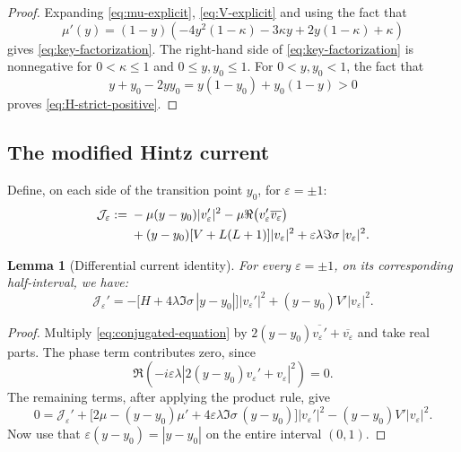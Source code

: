 \documentclass[11pt]{article}
\numberwithin{equation}{section}
\newtheorem{lemma}[theorem]{Lemma}
\newcommand{\br}[1]{\left( #1 \right)}
\begin{document}
	\begin{proof}
		{Expanding} \eqref{eq:mu-explicit},  \eqref{eq:V-explicit} and using the fact that
		\[
		\mu'(y) = (1-y)\br{ -4y^2(1-\kappa) - 3 \kappa y + 2y(1 - \kappa) + \kappa }
		\]
		{gives} \eqref{eq:key-factorization}.
		The right-hand side of \eqref{eq:key-factorization} is nonnegative for $0 < \kappa \le 1$ and $0 \le y, y_0 \le 1$. For
		$0<y,y_0<1$, the fact that
		\[
		y+y_0-2yy_0=y(1-y_0)+y_0(1-y)>0
		\]
		proves \eqref{eq:H-strict-positive}.
	\end{proof}
	
	\subsection{The modified Hintz current}
	
	Define, on each side of the transition point $y_0$, for $\varepsilon=\pm1$:
	\begin{align}
		\mathcal J_\varepsilon:={}&
		-\mu(y-y_0)|v_\varepsilon'|^2
		-\mu\Re\bigl(v_\varepsilon'\overline{v_\varepsilon}\bigr)
		\notag\\
		&+(y-y_0)[V+L(L+1)]|v_\varepsilon|^2
		+\varepsilon\lambda\Im\sigma\,|v_\varepsilon|^2.
		\label{eq:modified-Hintz-current}
	\end{align}
	
	\begin{lemma}[Differential current identity]
		\label{lem:differential-current-identity}
		For every $\varepsilon=\pm 1$, {on its corresponding half-interval}, we have:
		\begin{equation}
			\mathcal J_\varepsilon'
			=-\bigl[H+4\lambda\Im\sigma\,|y-y_0|\bigr]
			|v_\varepsilon'|^2
			+(y-y_0)V'|v_\varepsilon|^2.
			\label{eq:current-derivative}
		\end{equation}
	\end{lemma}
	
	\begin{proof}
		Multiply \eqref{eq:conjugated-equation} by
		$2(y-y_0)\overline{v_\varepsilon'}+\overline{v_\varepsilon}$
		and take real parts. 	The phase term contributes zero, since
		\[
		\Re\!\left(-i\varepsilon\lambda
		\left|2(y-y_0)v_\varepsilon'+v_\varepsilon\right|^2\right)=0.
		\]
		The remaining terms, after applying the product rule, give
		\[
		0=\mathcal J_\varepsilon'
		+\bigl[2\mu-(y-y_0)\mu'
		+4\varepsilon\lambda\Im\sigma\,(y-y_0)\bigr]
		|v_\varepsilon'|^2
		-(y-y_0)V'|v_\varepsilon|^2.
		\]
		Now use that $\varepsilon(y-y_0)=|y-y_0|$ on the entire interval $(0, 1)$.
	\end{proof}
	
\end{document}
